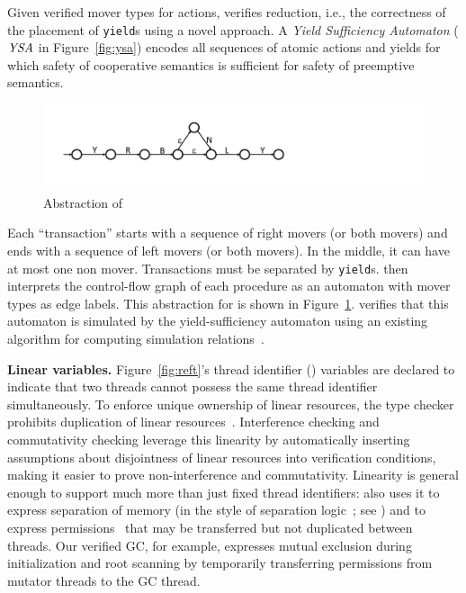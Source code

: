 Given verified mover types for actions, \civl verifies reduction, i.e., the correctness of the placement of {\tt yield}s using a novel  approach.
A {\em Yield Sufficiency Automaton\/} ($\mathit{YSA}$ in Figure~\ref{fig:ysa}) encodes all sequences of atomic actions and yields for which safety of cooperative semantics is sufficient 
for safety of preemptive semantics. 
\begin{figure}
\begin{center}
\includegraphics[scale=0.25]{WBSlow.pdf}
\end{center}
\vspace*{-0.2cm}
\caption{Abstraction of }
\label{fig:midwb}
\end{figure}
Each ``transaction'' starts with a sequence of right movers (or both movers) and ends with a sequence of left movers (or both movers).
In the middle, it can have at most one non mover. Transactions must be
separated by {\tt yield}s.
\civl then interprets the control-flow graph of each procedure as an automaton with mover types as edge labels. 
This abstraction for  is shown in Figure~\ref{fig:midwb}.
\civl verifies that this automaton is simulated by the yield-sufficiency automaton using an existing algorithm for computing simulation relations~\cite{HenzingerHK95}.

{\bf Linear variables.}
Figure~\ref{fig:reft}'s thread identifier () variables are declared  to indicate that two threads cannot possess the same thread identifier simultaneously.
To enforce unique ownership of linear resources, the \civl type checker prohibits duplication of linear resources~\cite{Wadler90lineartypes}.
Interference checking and commutativity checking leverage this linearity by automatically inserting assumptions about disjointness of linear resources into verification conditions,
making it easier to prove non-interference and commutativity.
Linearity is general enough to support much more than just fixed thread identifiers:
\civl also uses it to express separation of memory (in the style of separation logic~\cite{Reynolds02}; see \cite{LahiriQW11})
and to express permissions~\cite{boyland:03fractions} that may be transferred but not duplicated between threads.
Our verified GC, for example, expresses mutual exclusion during initialization and root scanning by temporarily transferring permissions from mutator threads to the GC thread.

